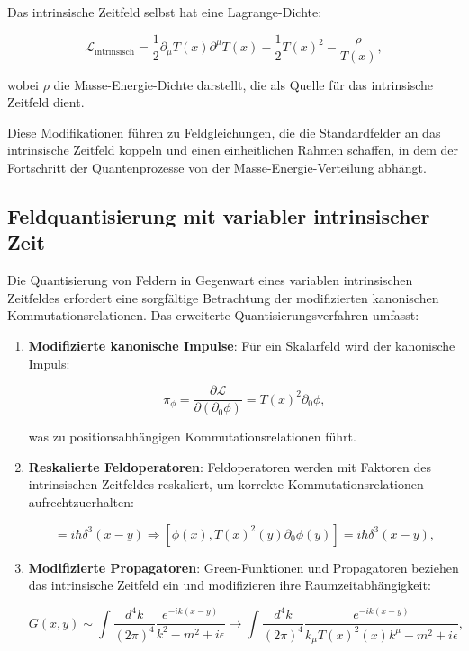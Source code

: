 \documentclass[12pt,a4paper]{article}
\newcommand{\Tfield}{T(x)}
\begin{document}
	Das intrinsische Zeitfeld selbst hat eine Lagrange-Dichte:
	
	\begin{equation}
		\mathcal{L}_{\text{intrinsisch}} = \frac{1}{2} \partial_\mu \Tfield \partial^\mu \Tfield - \frac{1}{2}\Tfield^2 - \frac{\rho}{\Tfield},
		\label{eq:intrinsic_lagrangian}
	\end{equation}
	
	wobei $\rho$ die Masse-Energie-Dichte darstellt, die als Quelle für das intrinsische Zeitfeld dient.
	
	Diese Modifikationen führen zu Feldgleichungen, die die Standardfelder an das intrinsische Zeitfeld koppeln und einen einheitlichen Rahmen schaffen, in dem der Fortschritt der Quantenprozesse von der Masse-Energie-Verteilung abhängt.
	
	\subsection{Feldquantisierung mit variabler intrinsischer Zeit}
	\label{subsec:field_quantization}
	
	Die Quantisierung von Feldern in Gegenwart eines variablen intrinsischen Zeitfeldes erfordert eine sorgfältige Betrachtung der modifizierten kanonischen Kommutationsrelationen. Das erweiterte Quantisierungsverfahren umfasst:
	
	\begin{enumerate}
		\item \textbf{Modifizierte kanonische Impulse}: Für ein Skalarfeld wird der kanonische Impuls:
		
		\begin{equation}
			\pi_\phi = \frac{\partial \mathcal{L}}{\partial(\partial_0 \phi)} = \Tfield^2 \partial_0 \phi,
			\label{eq:modified_momentum}
		\end{equation}
		
		was zu positionsabhängigen Kommutationsrelationen führt.
		
		\item \textbf{Reskalierte Feldoperatoren}: Feldoperatoren werden mit Faktoren des intrinsischen Zeitfeldes reskaliert, um korrekte Kommutationsrelationen aufrechtzuerhalten:
		
		\begin{equation}
			[\phi(x), \pi_\phi(y)] = i\hbar \delta^3(x-y) \Rightarrow [\phi(x), \Tfield^2(y)\partial_0 \phi(y)] = i\hbar \delta^3(x-y),
			\label{eq:rescaled_commutators}
		\end{equation}
		
		\item \textbf{Modifizierte Propagatoren}: Green-Funktionen und Propagatoren beziehen das intrinsische Zeitfeld ein und modifizieren ihre Raumzeitabhängigkeit:
		
		\begin{equation}
			G(x,y) \sim \int \frac{d^4k}{(2\pi)^4} \frac{e^{-ik(x-y)}}{k^2 - m^2 + i\epsilon} \rightarrow \int \frac{d^4k}{(2\pi)^4} \frac{e^{-ik(x-y)}}{k_\mu \Tfield^2(x) k^\mu - m^2 + i\epsilon},
			\label{eq:modified_propagator}
		\end{equation}
	\end{enumerate}
	
\end{document}
